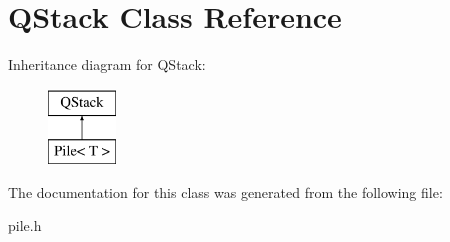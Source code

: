 \hypertarget{classQStack}{
\section{QStack Class Reference}
\label{classQStack}
}
Inheritance diagram for QStack:\begin{figure}[H]
\begin{center}
\leavevmode
\includegraphics[height=2cm]{classQStack}
\end{center}
\end{figure}


The documentation for this class was generated from the following file:\begin{DoxyCompactItemize}
\item 
pile.h\end{DoxyCompactItemize}
